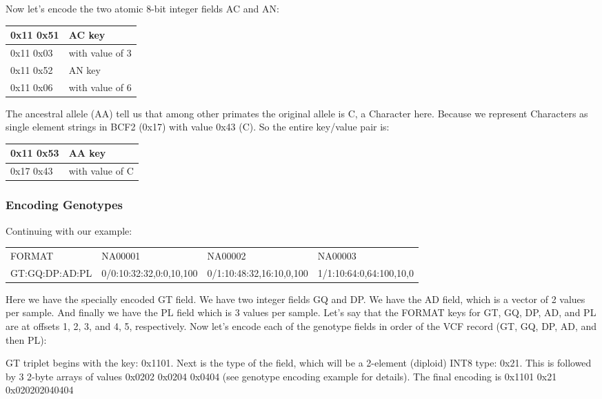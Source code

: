 \documentclass[8pt]{article}
\begin{document}
Now let's encode the two atomic 8-bit integer fields AC and AN:

\vspace{0.3cm}
\begin{tabular}{|l| l|} \hline
0x11 0x51 & AC key \\ \hline
0x11 0x03 & with value of 3 \\ \hline
0x11 0x52 & AN key \\ \hline
0x11 0x06 & with value of 6 \\ \hline
\end{tabular}
\vspace{0.3cm}

The ancestral allele (AA) tell us that among other primates the original allele is C, a Character here.  Because we represent Characters as single element strings in BCF2 (0x17) with value 0x43 (C).  So the entire key/value pair is:

\vspace{0.3cm}
\begin{tabular}{|l |l|} \hline
0x11 0x53 & AA key \\ \hline
0x17 0x43 & with value of C \\ \hline
\end{tabular}

\subsubsection{Encoding Genotypes}

Continuing with our example:

\vspace{0.3cm}
\begin{tabular}{l l l l}
FORMAT & NA00001 & NA00002 & NA00003 \\
GT:GQ:DP:AD:PL & 0/0:10:32:32,0:0,10,100 & 0/1:10:48:32,16:10,0,100 & 1/1:10:64:0,64:100,10,0 \\
\end{tabular}
\vspace{0.3cm}

Here we have the specially encoded GT field.  We have two integer fields GQ and DP.  We have the AD field, which is a vector of 2 values per sample.  And finally we have the PL field which is 3 values per sample.  Let's say that the FORMAT keys for GT, GQ, DP, AD, and PL are at offsets 1, 2, 3, and 4, 5, respectively.
Now let's encode each of the genotype fields in order of the VCF record (GT, GQ, DP, AD, and then PL):

GT triplet begins with the key: 0x1101.  Next is the type of the field, which will be a 2-element (diploid) INT8 type: 0x21.  This is followed by 3 2-byte arrays of values 0x0202 0x0204 0x0404 (see genotype encoding example for details).  The final encoding is 0x1101 0x21 0x020202040404
\end{document}
